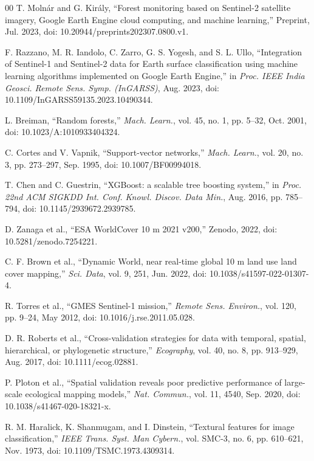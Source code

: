 \documentclass[conference]{IEEEtran}
\begin{document}
\begin{thebibliography}{00}
 T. Molnár and G. Király, ``Forest monitoring based on
Sentinel-2 satellite imagery, Google Earth Engine cloud computing, and
machine learning,'' Preprint, Jul. 2023, doi:
10.20944/preprints202307.0800.v1.

 F. Razzano, M. R. Iandolo, C. Zarro, G. S. Yogesh, and
S. L. Ullo, ``Integration of Sentinel-1 and Sentinel-2 data for Earth
surface classification using machine learning algorithms implemented on
Google Earth Engine,'' in \emph{Proc. IEEE India Geosci. Remote Sens.
Symp. (InGARSS)}, Aug. 2023, doi: 10.1109/InGARSS59135.2023.10490344.

 L. Breiman, ``Random forests,'' \emph{Mach. Learn.},
vol. 45, no. 1, pp. 5--32, Oct. 2001, doi: 10.1023/A:1010933404324.

 C. Cortes and V. Vapnik, ``Support-vector networks,''
\emph{Mach. Learn.}, vol. 20, no. 3, pp. 273--297, Sep. 1995, doi:
10.1007/BF00994018.

 T. Chen and C. Guestrin, ``XGBoost: a scalable tree
boosting system,'' in \emph{Proc. 22nd ACM SIGKDD Int. Conf. Knowl.
Discov. Data Min.}, Aug. 2016, pp. 785--794, doi:
10.1145/2939672.2939785.

 D. Zanaga et al., ``ESA WorldCover 10 m 2021 v200,''
Zenodo, 2022, doi: 10.5281/zenodo.7254221.

 C. F. Brown et al., ``Dynamic World, near real-time
global 10 m land use land cover mapping,'' \emph{Sci. Data}, vol. 9,
251, Jun. 2022, doi: 10.1038/s41597-022-01307-4.

 R. Torres et al., ``GMES Sentinel-1 mission,''
\emph{Remote Sens. Environ.}, vol. 120, pp. 9--24, May 2012, doi:
10.1016/j.rse.2011.05.028.

 D. R. Roberts et al., ``Cross-validation strategies for
data with temporal, spatial, hierarchical, or phylogenetic structure,''
\emph{Ecography}, vol. 40, no. 8, pp. 913--929, Aug. 2017, doi:
10.1111/ecog.02881.

 P. Ploton et al., ``Spatial validation reveals poor
predictive performance of large-scale ecological mapping models,''
\emph{Nat. Commun.}, vol. 11, 4540, Sep. 2020, doi:
10.1038/s41467-020-18321-x.

 R. M. Haralick, K. Shanmugam, and I. Dinstein,
``Textural features for image classification,'' \emph{IEEE Trans. Syst.
Man Cybern.}, vol. SMC-3, no. 6, pp. 610--621, Nov. 1973, doi:
10.1109/TSMC.1973.4309314.


\end{thebibliography}
\end{document}
